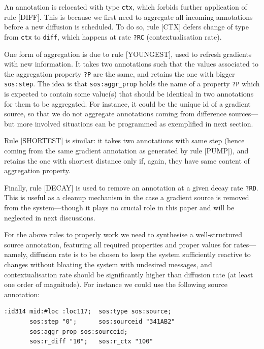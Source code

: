 \documentclass[12pt,a4paper,twoside,openright]{book}
\begin{document}
An annotation is relocated with type \texttt{ctx}, which forbids further application of rule [DIFF].
%
This is because we first need to aggregate all incoming annotations before a new diffusion is scheduled.
%
To do so, rule [CTX] defers change of type from \texttt{ctx} to \texttt{diff}, which happens at rate \texttt{?RC} (contextualisation rate).

One form of aggregation is due to rule [YOUNGEST], used to refresh gradients with new information.
%
It takes two annotations such that the values associated to the aggregation property \texttt{?P} are the same, and retains the one with bigger \texttt{sos:step}.
%
The idea is that \texttt{sos:aggr\_prop} holds the name of a property \texttt{?P} which is expected to contain some value(s) that should be identical in two annotations for them to be aggregated.
%
For instance, it could be the unique id of a gradient source, so that we do not aggregate annotations coming from difference sources---but more involved situations can be programmed as exemplified in next section.

Rule [SHORTEST] is similar: it takes two annotations with same step (hence coming from the same gradient annotation as generated by rule [PUMP]), and retains the one with shortest distance only if, again, they have same content of aggregation property.

Finally, rule [DECAY] is used to remove an annotation at a given decay rate \texttt{?RD}. This is useful as a cleanup mechanism in the case a gradient source is removed from the system---though it plays no crucial role in this paper and will be neglected in next discussions.

For the above rules to properly work we need to synthesise a well-structured source annotation, featuring all required properties and proper values for rates---namely, diffusion rate is to be chosen to keep the system sufficiently reactive to changes without bloating the system with undesired messages, and contextualisation rate should be significantly higher than diffusion rate (at least one order of magnitude).
%
For instance we could use the following source annotation:

{\begin{verbatim}
:id314 mid:#loc :loc117;  sos:type sos:source; 
       sos:step "0";      sos:sourceid "341AB2"
       sos:aggr_prop sos:sourceid; 
       sos:r_diff "10";   sos:r_ctx "100"
\end{verbatim}}
\end{document}
